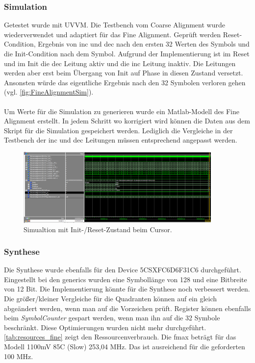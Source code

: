 \subsubsection{Simulation}
Getestet wurde mit UVVM. Die Testbench vom Coarse Alignment wurde wiederverwendet und adaptiert für das Fine Alignment. Geprüft werden Reset-Condition, Ergebnis von inc und dec nach den ersten 32 Werten des Symbols und die Init-Condition nach dem Symbol. Aufgrund der Implementierung ist im Reset und im Init die dec Leitung aktiv und die inc Leitung inaktiv. Die Leitungen werden aber erst beim Übergang von Init auf Phase in diesen Zustand versetzt. Ansonsten würde das eigentliche Ergebnis nach den 32 Symbolen verloren gehen (vgl. \autoref{fig:FineAlignmentSim}).\\
\\
Um Werte für die Simulation zu generieren wurde ein Matlab-Modell des Fine Alignment erstellt. In jedem Schritt wo korrigiert wird können die Daten aus dem Skript für die Simulation gespeichert werden. Lediglich die Vergleiche in der Testbench der inc und dec Leitungen müssen entsprechend angepasst werden.

\begin{figure}[htbp] 
	\centering
	\includegraphics[width=0.9\textwidth]{../img/FineAlignmentSim.png}
	\caption{Simualtion mit Init-/Reset-Zustand beim Cursor.}
	\label{fig:FineAlignmentSim}
\end{figure}

\subsubsection{Synthese}
Die Synthese wurde ebenfalls für den Device 5CSXFC6D6F31C6 durchgeführt. Eingestellt bei den generics wurden eine Symbollänge von 128 und eine Bitbreite von 12 Bit. Die Implementierung könnte für die Synthese noch verbessert werden. Die größer/kleiner Vergleiche für die Quadranten können auf ein gleich abgeändert werden, wenn man auf die Vorzeichen prüft. Register können ebenfalls beim \textit{SymbolCounter} gespart werden, wenn man ihn auf die 32 Symbole beschränkt. Diese Optimierungen wurden nicht mehr durchgeführt. \autoref{tab:resources_fine} zeigt den Ressourcenverbrauch. Die fmax beträgt für das Modell 1100mV 85C (Slow) 253,04 MHz. Das ist ausreichend für die geforderten 100 MHz.


